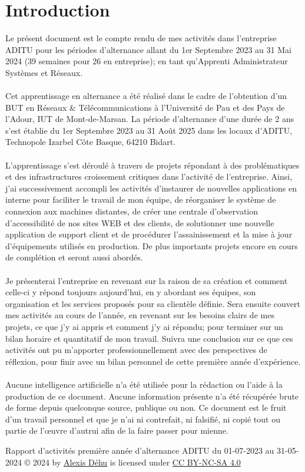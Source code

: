 \newpage
\setcounter{page}{1}
\pagestyle{plain}
\section{Introduction}

Le présent document est le compte rendu de mes activités dans l’entreprise ADITU pour les périodes d’alternance allant du 1er Septembre 2023 au 31 Mai 2024 (39 semaines pour 26 en entreprise); en tant qu’Apprenti Administrateur Systèmes et Réseaux.
\\ \\
Cet apprentissage en alternance a été réalisé dans le cadre de l’obtention d’un BUT en Réseaux \& Télécommunications à l’Université de Pau et des Pays de l’Adour, IUT de Mont-de-Marsan. La période d’alternance d’une durée de 2 ans s’est établie du 1er Septembre 2023 au 31 Août 2025 dans les locaux d’ADITU, Technopole Izarbel Côte Basque, 64210 Bidart.
\\ \\
L'apprentissage s'est déroulé à travers de projets répondant à des problématiques et des infrastructures croissement critiques dans l'activité de l'entreprise. Ainsi, j'ai successivement accompli les activités d'instaurer de nouvelles applications en interne pour faciliter le travail de mon équipe, de réorganiser le système de connexion aux machines distantes, de créer une centrale d'observation d'accessibilité de nos sites WEB et des clients, de solutionner une nouvelle application de support client et de procédurer l'assainissement et la mise à jour d'équipements utilisés en production. De plus importants projets encore en cours de complétion et seront aussi abordés.
\\ \\
Je présenterai l'entreprise en revenant sur la raison de sa création et comment celle-ci y répond toujours aujourd'hui, en y abordant ses équipes, son organisation et les services proposés pour sa clientèle définie. Sera ensuite couvert mes activités au cours de l'année, en revenant sur les besoins clairs de mes projets, ce que j'y ai appris et comment j'y ai répondu; pour terminer sur un bilan horaire et quantitatif de mon travail. Suivra une conclusion sur ce que ces activités ont pu m'apporter professionnellement avec des perspectives de réflexion, pour finir avec un bilan personnel de cette première année d'expérience.
\\ \\
Aucune intelligence artificielle n’a été utilisée pour la rédaction ou l’aide à la production de ce document. Aucune information présente n’a été récupérée brute de forme depuis quelconque source, publique ou non. Ce document est le fruit d’un travail personnel et que je n’ai ni contrefait, ni falsifié, ni copié tout ou partie de l’œuvre d’autrui afin de la faire passer pour mienne.
\\
\begin{center}
    Rapport d'activités première année d'alternance ADITU du 01-07-2023 au 31-05-2024 © 2024 by \href{https://fr.linkedin.com/in/alexisdehu}{Alexis Déhu} is licensed under \href{https://creativecommons.org/licenses/by-nc-sa/4.0/?ref=chooser-v1}{CC BY-NC-SA 4.0 }
\end{center}

\newpage